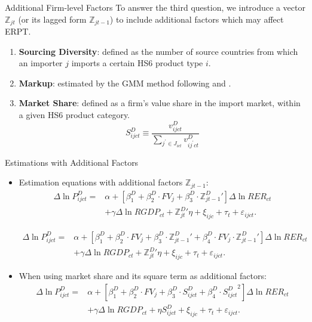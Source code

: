 \documentclass[10pt]{beamer}
\begin{document}
\begin{frame}{Additional Firm-level Factors}
	To answer the third question, we introduce a vector $\mathbb{Z}_{jt}$ (or its lagged form $\mathbb{Z}_{jt-1}$) to include additional factors which may affect ERPT.
	\begin{enumerate}
		\item \textbf{Sourcing Diversity}: defined as the number of source countries from which an importer $j$ imports a certain HS6 product type $i$. 
		\item \textbf{Markup}: estimated by the GMM method following \cite{dlw2012} and \cite{bkl2021}.
		\item \textbf{Market Share}: defined as a firm’s value share in the import market, within a given HS6 product category.
		$$
		S^{D}_{ijct} \equiv \frac{v^{D}_{ijct}}{\sum_{j^{\prime} \in J_{ict}} v^{D}_{ij^{\prime}ct}}
		$$
	\end{enumerate}
\end{frame}

\begin{frame}{Estimations with Additional Factors}
	\begin{itemize}
		\item Estimation equations with additional factors $\mathbb{Z}_{jt-1}$:
		\begin{equation}
			\begin{aligned}
				\Delta \ln P^{D}_{ijct} =&\alpha+[\beta^D_{1}+ \beta^D_{2} \cdot FV_{j}+\beta^D_{3} \cdot {\mathbb{Z}^{D}_{jt-1}}'] \Delta \ln RER_{ct} \\
				&+\gamma \Delta \ln RGDP_{ct}+ {\mathbb{Z}^{D}_{jt}}' \eta+\xi_{ijc}+\tau_{t} +\varepsilon_{ijct}.
				\label{eq4.3}
			\end{aligned}	
		\end{equation}
		
		\begin{equation}
			\begin{aligned}
				\Delta \ln P^{D}_{ijct}=&\alpha+[\beta^D_{1}+ \beta^D_{2} \cdot FV_{j}+\beta^D_{3} \cdot {\mathbb{Z}^{D}_{jt-1}}'+\beta^D_{4} \cdot FV_{j} \cdot {\mathbb{Z}^{D}_{jt-1}}'] \Delta \ln RER_{ct} \\ 
				&+\gamma \Delta \ln RGDP_{ct}+ {\mathbb{Z}^{D}_{jt}}' \eta+\xi_{ijc}+\tau_{t} +\varepsilon_{ijct}.
			\end{aligned}	
			\label{eq4.4}
		\end{equation}
		\item When using market share and its square term as additional factors:
		\begin{equation}
			\begin{aligned}
				\Delta \ln P^{D}_{ijct}=&\alpha+[\beta^D_{1}+ \beta^D_{2} \cdot FV_{j}+\beta^D_{3} \cdot S^{D}_{ijct}+\beta^D_4 \cdot {S^{D}_{ijct}}^2] \Delta \ln RER_{ct} \\
				&+\gamma \Delta \ln RGDP_{ct}+ \eta S^{D}_{ijct}+\xi_{ijc}+\tau_{t} +\varepsilon_{ijct}.
			\end{aligned}
			\label{eq4.5}
		\end{equation}
	\end{itemize}
\end{frame}
\end{document}
